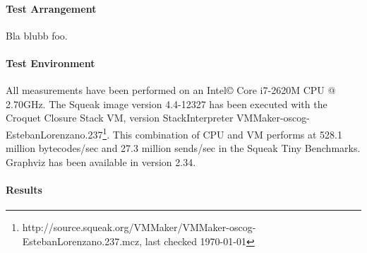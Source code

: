 \paragraph{Test Arrangement}
Bla blubb foo.

\paragraph{Test Environment} All measurements have been performed on an Intel\copyright{} Core\texttrademark{}  i7-2620M CPU @ 2.70GHz.
The Squeak image version 4.4-12327 has been executed with the Croquet Closure Stack VM, version StackInterpreter VMMaker-oscog-EstebanLorenzano.237\footnote{http://source.squeak.org/VMMaker/VMMaker-oscog-EstebanLorenzano.237.mcz, last checked \today}. This combination of CPU and VM performs at 528.1 million bytecodes/sec and 27.3 million sends/sec in the Squeak Tiny Benchmarks. Graphviz has been available in version 2.34.

\paragraph{Results}

